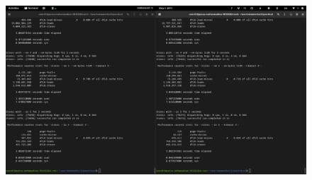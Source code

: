 \documentclass{article}
\begin{document}
\subsection{}
\begin{figure}[H]
   \centering
   \includegraphics[width=\linewidth]{3-2.png}
\end{figure}
\end{document}
